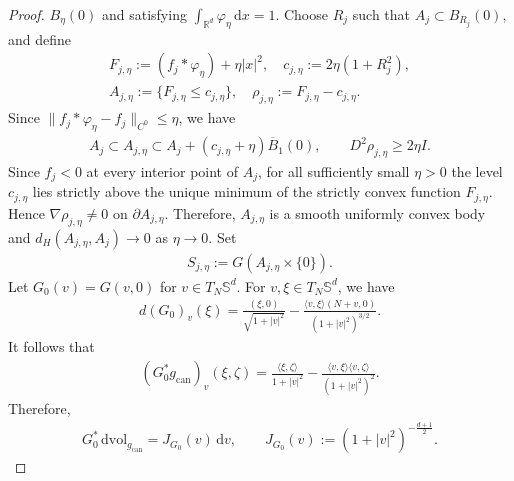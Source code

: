 \documentclass[11pt,reqno]{amsart}
\numberwithin{equation}{section}
\theoremstyle{definition}
\theoremstyle{remark}
\def\bR {\mathbb{R}}
\def\bS {\mathbb{S}}
\newcommand{\la}{\langle}
\newcommand{\ra}{\rangle}
\newcommand{\ud}{\mathrm{d}}
\newcommand{\0}{\emptyset}
\newcommand{\can}{\mathrm{can}}
\newcommand{\dvol}{\,\mathrm{dvol}}
\begin{document}
\begin{proof}
$B_\eta(0)$ and satisfying $ \int_{\bR^d}\varphi_\eta\,\ud x = 1$. Choose $R_j$ such that $A_j\subset B_{R_j}(0)$, and define
\begin{align}
        F_{j,\eta}
        :=(f_j*\varphi_\eta)+\eta|x|^2,
        \quad 
        c_{j,\eta}
        :=2\eta(1+R_j^2),
        \\
        A_{j,\eta}
        :=\{F_{j,\eta}\leq c_{j,\eta}\},
        \quad 
        \rho_{j,\eta}
        :=F_{j,\eta}-c_{j,\eta}.
\end{align}
Since $\|f_j*\varphi_\eta-f_j\|_{C^0}\leq\eta$, we have
\begin{align}\label{eq:hemisphere-pancake-smooth-approximation}
        A_j
        \subset
        A_{j,\eta}
        \subset
        A_j+(c_{j,\eta}+\eta)\overline B_1(0),
        \qquad
        D^2\rho_{j,\eta}
        \geq
        2\eta I.
\end{align}
Since $f_j<0$ at every interior point of $A_j$, for all sufficiently small
$\eta>0$ the level $c_{j,\eta}$ lies strictly above the unique minimum of
the strictly convex function $F_{j,\eta}$. Hence $\nabla\rho_{j,\eta}\neq0$ on $\partial A_{j,\eta}$. Therefore, $A_{j,\eta}$ is a smooth uniformly convex body and
$d_H(A_{j,\eta},A_j)\to0$ as $\eta\to0$. Set
\begin{align}
        S_{j,\eta}
        :=
        G(A_{j,\eta}\times\{0\}).
\end{align}
Let $G_0(v)=G(v,0)$ for $v\in T_N \bS^{d}.$ For $v,\xi\in T_N\bS^d$, we have
\begin{align}
        d(G_0)_v(\xi)
        =
        \frac{(\xi,0)}{\sqrt{1+|v|^2}}
        -
        \frac{\la v,\xi\ra(N+v,0)}
        {(1+|v|^2)^{3/2}}.
\end{align}
It follows that
\begin{align}
        (G_0^*g_{\can})_v(\xi,\zeta)
        =
        \frac{\la\xi,\zeta\ra}{1+|v|^2}
        -
        \frac{\la v,\xi\ra\la v,\zeta\ra}
        {(1+|v|^2)^2}.
\end{align}
Therefore,
\begin{align}\label{eq:hemisphere-pancake-gnomonic-Jacobian}
        G_0^*\dvol_{g_{\can}}
        =
        J_{G_0}(v)\,\ud v,
        \qquad
        J_{G_0}(v)
        :=
        (1+|v|^2)^{-\frac{d+1}{2}}.
\end{align}


\end{proof}
\end{document}
